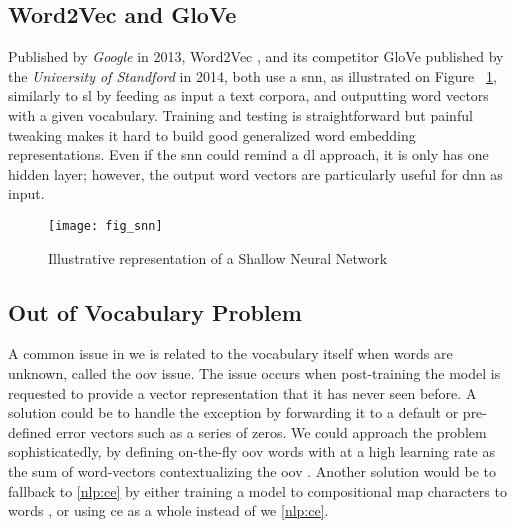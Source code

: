 \subsection{Word2Vec and GloVe}
\label{nlp:word2vec}
Published by \textit{Google} in 2013, Word2Vec \autocite{paper:word2vec}, and its competitor GloVe \autocite{paper:glove} published by the \textit{University of Standford} in 2014, both use a \gls{snn}, as illustrated on Figure ~\ref{fig:fig_snn}, similarly to \gls{sl} by feeding as input a text corpora, and outputting word vectors with a given vocabulary. Training and testing is straightforward but painful tweaking makes it hard to build good generalized word embedding representations. Even if the \gls{snn} could remind a \gls{dl} approach, it is only has one hidden layer; however, the output word vectors are particularly useful for \gls{dnn} as input.

\begin{figure}
    \centering
    \texttt{[image: fig\_snn]}
    \caption{Illustrative representation of a Shallow Neural Network}
    \label{fig:fig_snn}
\end{figure}

\subsection{Out of Vocabulary Problem}
\label{nlp:oov}
A common issue in \gls{we} is related to the vocabulary itself when words are unknown, called the \gls{oov} issue. The issue occurs when post-training the model is requested to provide a vector representation that it has never seen before. A solution could be to handle the exception by forwarding it to a default or pre-defined error vectors such as a series of zeros. We could approach the problem sophisticatedly, by defining on-the-fly \gls{oov} words with at a high learning rate as the sum of word-vectors contextualizing the \gls{oov}  \autocite{paper:journals/corr/HerbelotB17}. Another solution would be to fallback to \ref{nlp:ce} by either training a model to compositional map characters to words \autocite{paper:journals/corr/PinterGE17}, or using \gls{ce} as a whole instead of \gls{we} \ref{nlp:ce}.

